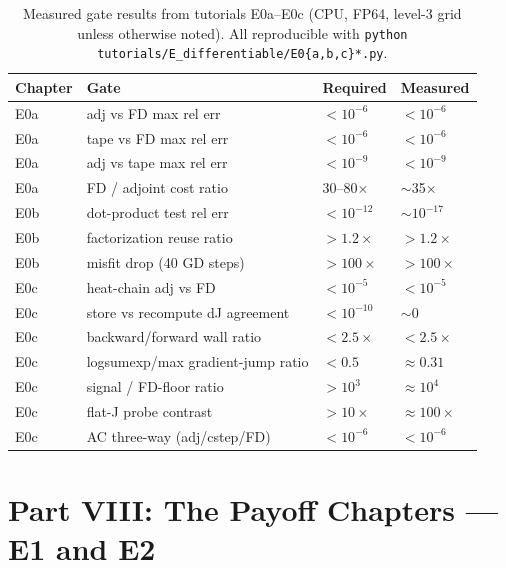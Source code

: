 \documentclass[11pt]{article}
\begin{document}
\begin{table}[h]
\centering
\caption{Measured gate results from tutorials E0a--E0c (CPU, FP64,
level-3 grid unless otherwise noted).  All reproducible with
\texttt{python tutorials/E\_differentiable/E0\{a,b,c\}*.py}.}
\label{tab:gates}
\begin{tabular}{llll}
\toprule
Chapter & Gate & Required & Measured \\
\midrule
E0a & adj vs FD max rel err           & $< 10^{-6}$  & $< 10^{-6}$ \\
E0a & tape vs FD max rel err          & $< 10^{-6}$  & $< 10^{-6}$ \\
E0a & adj vs tape max rel err         & $< 10^{-9}$  & $< 10^{-9}$ \\
E0a & FD / adjoint cost ratio         & 30--80$\times$ & $\sim$35$\times$ \\
\midrule
E0b & dot-product test rel err        & $< 10^{-12}$ & $\sim 10^{-17}$ \\
E0b & factorization reuse ratio       & $> 1.2\times$  & $> 1.2\times$ \\
E0b & misfit drop (40 GD steps)       & $> 100\times$  & $> 100\times$ \\
\midrule
E0c & heat-chain adj vs FD            & $< 10^{-5}$  & $< 10^{-5}$ \\
E0c & store vs recompute dJ agreement & $< 10^{-10}$ & $\sim 0$ \\
E0c & backward/forward wall ratio     & $< 2.5\times$  & $< 2.5\times$ \\
E0c & logsumexp/max gradient-jump ratio & $< 0.5$    & $\approx 0.31$ \\
E0c & signal / FD-floor ratio         & $> 10^3$     & $\approx 10^4$ \\
E0c & flat-J probe contrast           & $> 10\times$   & $\approx 100\times$ \\
E0c & AC three-way (adj/cstep/FD)     & $< 10^{-6}$  & $< 10^{-6}$ \\
\bottomrule
\end{tabular}
\end{table}

\section*{Part VIII: The Payoff Chapters — E1 and E2}

\end{document}
